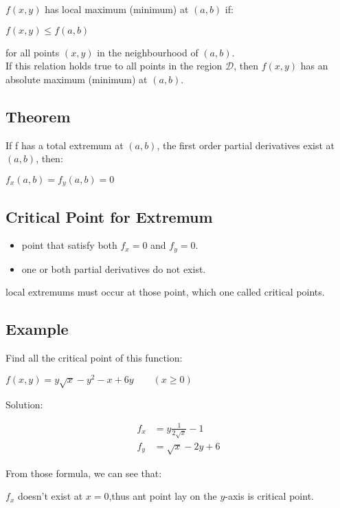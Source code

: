 \documentclass[UTF8,a4paper, 10pt, openany]{svmono}
\begin{document}
$f(x,y)$ has local maximum (minimum) at $(a,b)$ if:

\begin{center}
$f(x,y)\leq f(a,b)$
\end{center}

for all points $(x,y)$ in the neighbourhood of $(a,b)$.\\

If this relation holds true to all points in the region $\mathcal{D}$, then $f(x,y)$ has an absolute maximum (minimum) at $(a,b)$.

\subsection{Theorem}
If f has a total extremum at $(a,b)$, the first order partial derivatives exist at $(a,b)$, then:

\begin{center}
$f_x(a,b)=f_y(a,b)=0$
\end{center}

\subsection{Critical Point for Extremum}
\begin{itemize}
\item point that satisfy both $f_x=0$ and $f_y=0$.
\item one or both partial derivatives do not exist.
\end{itemize}

local extremums must occur at those point, which one called critical points.

\subsection{Example}
Find all the critical point of this function:
\begin{center}
$f(x,y)=y\sqrt{x}-y^2-x+6y\qquad (x\geq 0)$
\end{center}

Solution:

\begin{align*}
f_x &=y\frac{1}{2\sqrt{x}}-1\\
f_y &=\sqrt{x}-2y+6
\end{align*}

From those formula, we can see that:

$f_x$ doesn't exist at $x=0$,thus ant point lay on the $y$-axis is critical point.
\end{document}
